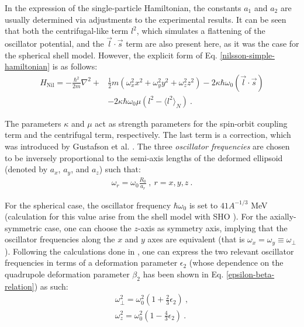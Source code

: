 In the expression of the single-particle Hamiltonian, the constants $a_1$ and $a_2$ are usually determined via adjustments to the experimental results. It can be seen that both the centrifugal-like term $l^2$, which simulates a flattening of the oscillator potential, and the $\vec{l}\cdot\vec{s}$ term are also present here, as it was the case for the spherical shell model. However, the explicit form of Eq. \ref{nilsson-simple-hamiltonian} is as follows:
\begin{align}
    H_\text{Nil}=-\frac{\hbar^2}{2m}\nabla^2+&\frac{1}{2}m(\omega_x^2x^2+\omega_y^2y^2+\omega_z^2z^2)-2\kappa\hbar\omega_0(\vec{l}\cdot\vec{s})\nonumber\\&-2\kappa\hbar\omega_0\mu\left(l^2-\langle l^2\rangle_N\right)\ .
    \label{eq-full-nilsson-ham}
\end{align}

The parameters $\kappa$ and $\mu$ act as strength parameters for the spin-orbit coupling term and the centrifugal term, respectively. The last term is a correction, which was introduced by Gustafson et al. \cite{gustafson1967nuclear}.
The three \emph{oscillator frequencies} are chosen to be inversely proportional to the semi-axis lengths of the deformed ellipsoid (denoted by $a_x$, $a_y$, and $a_z$) such that:
\begin{align}
    \omega_r=\omega_0\frac{R_0}{a_r}\ ,\ r=x,y,z\ .
\end{align}

For the spherical case, the oscillator frequency $\hbar\omega_0$ is set to $41A^{-1/3}$ MeV (calculation for this value arise from the shell model with SHO \cite{bertulani2007nuclear}). For the axially-symmetric case, one can choose the $z$-axis as symmetry axis, implying that the oscillator frequencies along the $x$ and $y$ axes are equivalent (that is $\omega_x=\omega_y\equiv\omega_\perp$). Following the calculations done in \cite{bertulani2007nuclear}, one can express the two relevant oscillator frequencies in terms of a deformation parameter $\epsilon_2$ (whose dependence on the quadrupole deformation parameter $\beta_2$ has been shown in Eq. \ref{epsilon-beta-relation}) as such:
\begin{align}
    \omega_\perp^2=\omega_0^2\left(1+\frac{2}{3}\epsilon_2\right)\ ,\\
    \omega_z^2=\omega_0^2\left(1-\frac{4}{3}\epsilon_2\right)\ .
    \label{oscillator-frequencies-nilsson}
\end{align}

